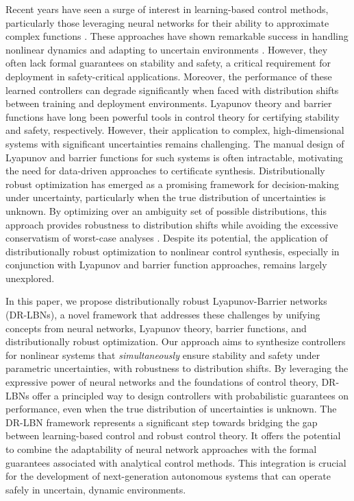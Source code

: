 \documentclass[11pt, oneside]{article}
\begin{document}
Recent years have seen a surge of interest in learning-based control methods, particularly those leveraging neural networks for their ability to approximate complex functions \cite{brunke2022safe}. These approaches have shown remarkable success in handling nonlinear dynamics and adapting to uncertain environments \cite{recht2019tour}. However, they often lack formal guarantees on stability and safety, a critical requirement for deployment in safety-critical applications. Moreover, the performance of these learned controllers can degrade significantly when faced with distribution shifts between training and deployment environments. Lyapunov theory and barrier functions have long been powerful tools in control theory for certifying stability and safety, respectively. However, their application to complex, high-dimensional systems with significant uncertainties remains challenging. The manual design of Lyapunov and barrier functions for such systems is often intractable, motivating the need for data-driven approaches to certificate synthesis. Distributionally robust optimization has emerged as a promising framework for decision-making under uncertainty, particularly when the true distribution of uncertainties is unknown. By optimizing over an ambiguity set of possible distributions, this approach provides robustness to distribution shifts while avoiding the excessive conservatism of worst-case analyses \cite{long2023distributionally}. Despite its potential, the application of distributionally robust optimization to nonlinear control synthesis, especially in conjunction with Lyapunov and barrier function approaches, remains largely unexplored.

In this paper, we propose distributionally robust Lyapunov-Barrier networks (DR-LBNs), a novel framework that addresses these challenges by unifying concepts from neural networks, Lyapunov theory, barrier functions, and distributionally robust optimization. Our approach aims to synthesize controllers for nonlinear systems that \emph{simultaneously} ensure stability and safety under parametric uncertainties, with robustness to distribution shifts. By leveraging the expressive power of neural networks and the foundations of control theory, DR-LBNs offer a principled way to design controllers with probabilistic guarantees on performance, even when the true distribution of uncertainties is unknown. The DR-LBN framework represents a significant step towards bridging the gap between learning-based control and robust control theory. It offers the potential to combine the adaptability of neural network approaches with the formal guarantees associated with analytical control methods. This integration is crucial for the development of next-generation autonomous systems that can operate safely in uncertain, dynamic environments. 
\end{document}
